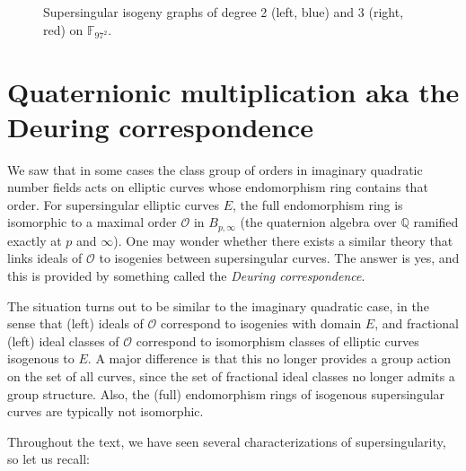 \documentclass[10pt]{article}
\theoremstyle{plain}
\theoremstyle{definition}
\def\F{\ensuremath{\mathbb{F}}}
\def\Q{\ensuremath{\mathbb{Q}}}
\def\O{\ensuremath{\mathcal{O}}}
\begin{document}
\begin{prposition}
\begin{figure}
  \caption{Supersingular isogeny graphs of degree 2 (left, blue) and 3
    (right, red) on $\F_{97^2}$.}
  \label{fig:sup-97-2-3}
\end{figure}


\section{Quaternionic multiplication aka the Deuring correspondence}

We saw that in some cases the class group of orders in imaginary quadratic
number fields acts on elliptic curves whose endomorphism ring
contains that order. For supersingular elliptic curves $E$, the full
endomorphism ring is isomorphic to 
a maximal order $\O$ in $B_{p,\infty}$ (the quaternion algebra
over $\Q$ ramified exactly at $p$ and $\infty$).
One may wonder whether there exists a similar theory that links
ideals of $\O$ to isogenies between supersingular curves.
The answer is yes, and this is provided by something called the
\emph{Deuring correspondence}.

The situation turns out to be similar to the imaginary quadratic case,
in the sense that (left) ideals of $\O$ correspond to isogenies
with domain $E$, and fractional (left) ideal classes of $\O$
correspond to isomorphism classes of elliptic curves isogenous to $E$.
A major difference is that this no longer provides a group action
on the set of all curves, since the set of fractional ideal classes
no longer admits a group structure.
Also, the (full) endomorphism rings of isogenous supersingular
curves are typically not isomorphic. %

Throughout the text, we have seen several characterizations
of supersingularity, so let us recall:


\end{prposition}
\end{document}
